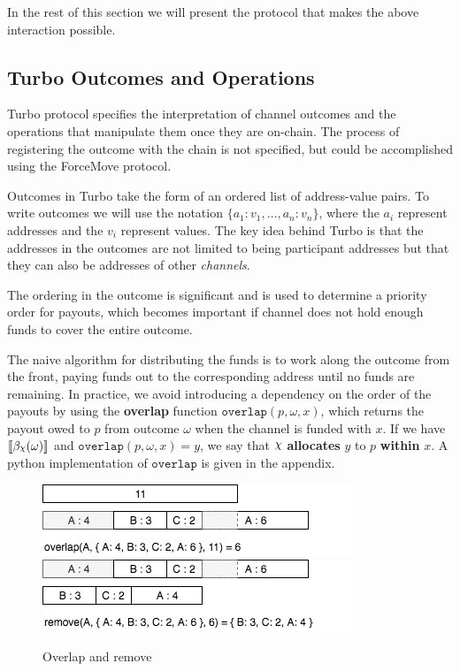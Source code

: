\documentclass{article}
\DeclareRobustCommand{\rchi}{{\mathpalette\irchi\relax}}
\newcommand{\irchi}[2]{\raisebox{\depth}{$#1\chi$}} %
\theoremstyle{definition}
\newcommand{\adj}[1]{\llbracket #1 \rrbracket}
\begin{document}
In the rest of this section we will present the protocol that makes the above interaction
possible.

\subsection{Turbo Outcomes and Operations}

Turbo protocol specifies the interpretation of channel outcomes and the operations that
manipulate them once they are on-chain.
The process of registering the outcome with the chain is not specified, but could be accomplished
using the ForceMove protocol.

Outcomes in Turbo take the form of an ordered list of address-value pairs.
To write outcomes we will use the notation $\{a_1{:}v_1, \dots, a_n{:}v_n \}$, where the $a_i$
represent addresses and the $v_i$ represent values.
The key idea behind Turbo is that the addresses in the outcomes are not limited to being
participant addresses but that they can also be addresses of other \textit{channels}.

The ordering in the outcome is significant and is used to determine a priority order for payouts,
which becomes important if channel does not hold enough funds to cover the entire outcome.

The naive algorithm for distributing the funds is to work along the outcome from the front,
paying funds out to the corresponding address until no funds are remaining.
In practice, we avoid introducing a dependency on the order of the payouts by using
the \textbf{overlap} function $\texttt{overlap}(p, \omega, x)$, which returns the payout owed
to $p$ from outcome $\omega$ when the channel is funded with $x$.
If we have $\adj{\beta_\rchi(\omega)}$ and $\texttt{overlap}(p, \omega, x) = y$, we say that $\rchi$ \textbf{allocates} $y$ to $p$ \textbf{within} $x$.
A python implementation of $\texttt{overlap}$ is given in the appendix.

\begin{figure}[ht]
  \centering
  \includegraphics[scale=0.7]{overlap} %
  \includegraphics[scale=0.7]{remove} %
  \caption{Overlap and remove}
\end{figure}
\end{document}
